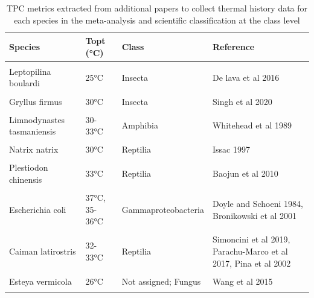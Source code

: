 \documentclass[12pt,twoside]{reedthesis}
\begin{document}
\begin{table}[!h]

\caption[Thermal stress data by species]{\label{tab:unnamed-chunk-31}TPC metrics extracted from additional papers to collect thermal history data for each species in the meta-analysis and scientific classification at the class level}
\centering
\begin{tabular}[t]{>{\raggedright\arraybackslash}p{3cm}ll>{\raggedright\arraybackslash}p{3cm}}
\toprule
\textbf{Species} & \textbf{Topt (°C)} & \textbf{Class} & \textbf{Reference}\\
\midrule
\cellcolor{gray!6}{Drosophila melanogaster} & \cellcolor{gray!6}{24-26.6°C} & \cellcolor{gray!6}{Insecta} & \cellcolor{gray!6}{Klepsatel 2013, David 1988}\\
Leptopilina boulardi & 25°C & Insecta & De lava et al 2016\\
\cellcolor{gray!6}{Mauremys reevesii} & \cellcolor{gray!6}{37.97 ± 0.64 °C} & \cellcolor{gray!6}{Reptilia} & \cellcolor{gray!6}{Dang et al 2019}\\
Gryllus firmus & 30°C & Insecta & Singh et al 2020\\
\cellcolor{gray!6}{Limnodynastes peronii} & \cellcolor{gray!6}{30°C} & \cellcolor{gray!6}{Amphibia} & \cellcolor{gray!6}{Seebacher et al 2014}\\
\addlinespace
Limnodynastes tasmaniensis & 30-33°C & Amphibia & Whitehead et al 1989\\
\cellcolor{gray!6}{Platyplectrum ornatum} & \cellcolor{gray!6}{33°C} & \cellcolor{gray!6}{Amphibia} & \cellcolor{gray!6}{Kern et al 2014}\\
Natrix natrix & 30°C & Reptilia & Issac 1997\\
\cellcolor{gray!6}{Coturnix japoncia} & \cellcolor{gray!6}{26°C} & \cellcolor{gray!6}{Aves} & \cellcolor{gray!6}{Alagawany et al 2017}\\
Plestiodon chinensis & 33°C & Reptilia & Baojun et al 2010\\
\addlinespace
\cellcolor{gray!6}{Rhodnis prolixus} & \cellcolor{gray!6}{30-35°C} & \cellcolor{gray!6}{Insecta} & \cellcolor{gray!6}{Fresquet and Lazzari 2011}\\
Escherichia coli & 37°C, 35-36°C & Gammaproteobacteria & Doyle and Schoeni 1984, Bronikowski et al 2001\\
\cellcolor{gray!6}{Salmonella} & \cellcolor{gray!6}{35-36°C} & \cellcolor{gray!6}{Gammaproteobacteria} & \cellcolor{gray!6}{Bronikowski et al 2001}\\
Caiman latirostris & 32-33°C & Reptilia & Simoncini et al 2019, Parachu-Marco et al 2017, Pina et al 2002\\
\cellcolor{gray!6}{Trachemys scripta} & \cellcolor{gray!6}{32-33°C} & \cellcolor{gray!6}{Reptilia} & \cellcolor{gray!6}{Dang et al 2019}\\
\addlinespace
Esteya vermicola & 26°C & Not assigned; Fungus & Wang et al 2015\\
\cellcolor{gray!6}{Xylotrechus arvicola} & \cellcolor{gray!6}{N/A} & \cellcolor{gray!6}{Insecta} & \cellcolor{gray!6}{Garcia-Ruiz et al 2011}\\
\bottomrule
\end{tabular}
\end{table}
\backmatter
\end{document}
